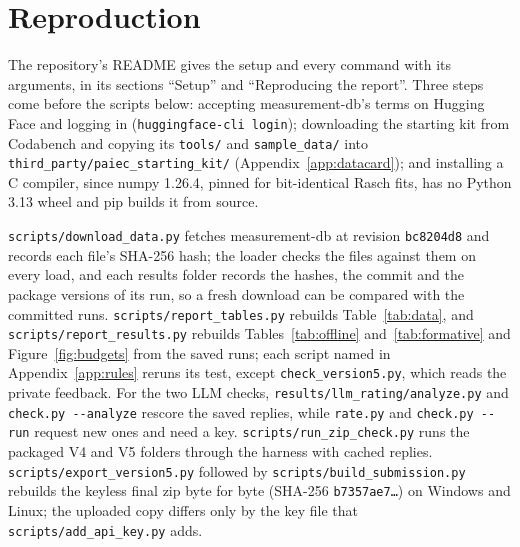 \section{Reproduction}\label{app:repro}

The repository's README gives the setup and every command with its arguments, in its sections ``Setup'' and ``Reproducing the report''. Three steps come before the scripts below: accepting measurement-db's terms on Hugging Face and logging in (\texttt{huggingface-cli login}); downloading the starting kit from Codabench and copying its \texttt{tools/} and \texttt{sample\_data/} into \texttt{third\_party/paiec\_starting\_kit/} (Appendix~\ref{app:datacard}); and installing a C compiler, since numpy 1.26.4, pinned for bit-identical Rasch fits, has no Python 3.13 wheel and pip builds it from source.

\texttt{scripts/download\_data.py} fetches measurement-db at revision \texttt{bc8204d8} and records each file's SHA-256 hash; the loader checks the files against them on every load, and each results folder records the hashes, the commit and the package versions of its run, so a fresh download can be compared with the committed runs. \texttt{scripts/report\_tables.py} rebuilds Table~\ref{tab:data}, and \texttt{scripts/report\_results.py} rebuilds Tables~\ref{tab:offline} and~\ref{tab:formative} and Figure~\ref{fig:budgets} from the saved runs; each script named in Appendix~\ref{app:rules} reruns its test, except \texttt{check\_version5.py}, which reads the private feedback. For the two LLM checks, \texttt{results/llm\_rating/analyze.py} and \texttt{check.py -{}-analyze} rescore the saved replies, while \texttt{rate.py} and \texttt{check.py -{}-run} request new ones and need a key. \texttt{scripts/run\_zip\_check.py} runs the packaged V4 and V5 folders through the harness with cached replies. \texttt{scripts/export\_version5.py} followed by \texttt{scripts/build\_submission.py} rebuilds the keyless final zip byte for byte (SHA-256 \texttt{b7357ae7\ldots}) on Windows and Linux; the uploaded copy differs only by the key file that \texttt{scripts/add\_api\_key.py} adds.
